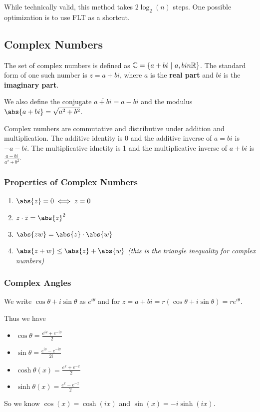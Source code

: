 \documentclass[12pt]{article}
\begin{document}
While technically valid, this method takes $2\log_2 (n)$ steps. One possible optimization is to use FLT as a shortcut.

\subsection*{Complex Numbers}
The set of complex numbers is defined as $\mathbb{C} = \{ a + bi \ |\  a, b in \mathbb{R} \}$. The standard form of one such number is $z = a + bi$, where $a$ is the {\bf real part} and $bi$ is the {\bf imaginary part}.

We also define the conjugate $\overline{a + bi} = a - bi$ and the modulus $\abs{a + bi} = \sqrt{a^2 + b^2}$.

Complex numbers are commutative and distributive under addition and multiplication. The additive identity is 0 and the additive inverse of $a = bi$ is $-a - bi$. The multiplicative idnetity is 1 and the multiplicative inverse of $a + bi$ is $\frac{a-bi}{a^2 + b^2}$.

\subsubsection*{Properties of Complex Numbers}
\begin{enumerate}
\item $\abs{z} = 0 \iff z = 0$
\item $z \cdot \overline{z} = \abs{z}^2$
\item $\abs{zw} = \abs{z} \cdot \abs{w}$
\item $\abs{z + w} \leq \abs{z} + \abs{w}$ \emph{(this is the triangle inequality for complex numbers)}
\end{enumerate}

\subsubsection*{Complex Angles}
We write $\cos\theta + i \sin\theta$ as $e^{i\theta}$ and for $z = a + bi = r(\cos\theta + i\sin\theta) = re^{i\theta}$.

Thus we have
\begin{itemize}
\item $\cos\theta = \frac{e^{i\theta} + e^{-i\theta}}{2}$
\item $\sin\theta = \frac{e^{i\theta} - e^{-i\theta}}{2i}$
\item $\cosh\theta(x) = \frac{e^x + e^{-x}}{2}$
\item $\sinh\theta(x) = \frac{e^x - e^{-x}}{2}$
\end{itemize}
So we know $\cos(x) = \cosh(ix)$ and $\sin(x) = -i\sinh(ix)$.
\end{document}
